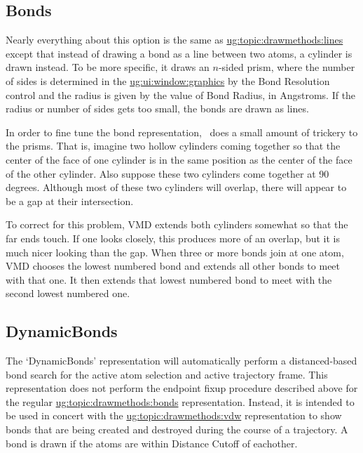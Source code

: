 \subsection{Bonds}
\label{ug:topic:drawmethods:bonds}
Nearly everything about this option is the same as
\hyperref{`Lines'}{`Lines' [\S~}{]}{ug:topic:drawmethods:lines} except that
instead of drawing a bond as a line between two atoms, a cylinder is drawn
instead.  To be more specific, it draws an $n$-sided prism, where the number
of sides is determined in the \hyperref{{\sf Graphics} window}{{\sf Graphics}
window [\S }{]}{ug:ui:window:graphics} by the {\sf Bond Resolution} control and
the radius is given by the value of {\sf Bond Radius}, in Angstroms.  If the
radius or number of sides gets too small, the bonds are drawn as
lines.

In order to fine tune the bond representation, \VMD\ does a small
amount of trickery to the prisms.  That is, imagine two hollow
cylinders coming together so that the center of the face of one cylinder is
in the same position as the center of the face of the other cylinder.
Also suppose these two cylinders come together at 90 degrees.
Although most of these two cylinders will overlap, there will appear
to be a gap at their intersection.

To correct for this problem, VMD extends both cylinders somewhat so
that the far ends touch.  If one looks closely, this produces more of
an overlap, but it is much nicer looking than the gap.  When three or
more bonds join at one atom, VMD chooses the lowest numbered bond and
extends all other bonds to meet with that one.  It then extends that
lowest numbered bond to meet with the second lowest numbered one.


\subsection{DynamicBonds}
The `DynamicBonds' representation will automatically perform a
distanced-based bond search for the active atom selection and active
trajectory frame.  This representation does not perform the endpoint fixup
procedure described above for the regular \hyperref{`Bonds'}{`Bonds'
[\S~}{]}{ug:topic:drawmethods:bonds} representation.  Instead, it is
intended to be used in concert with the \hyperref{`VDW'}{`VDW'
[\S~}{]}{ug:topic:drawmethods:vdw} representation to show bonds that are
being created and destroyed during the course of a trajectory.  A bond is
drawn if the atoms are within {\sf Distance Cutoff} of eachother. 


